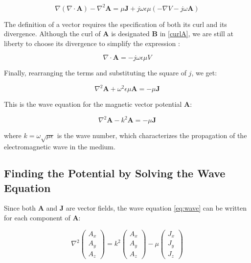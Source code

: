\[
    \nabla (\nabla \cdot \mathbf{A}) - \nabla^2 
    \mathbf{A} = \mu \mathbf{J} + j\omega \epsilon 
    \mu \left(-\nabla V - j \omega \mathbf{A}\right)
\]

The definition of a vector requires the specification 
of both its curl and its divergence. Although the curl 
of $\mathbf{A}$ is designated $\mathbf{B}$ in 
\ref{curlA}, we are still at liberty to choose its 
divergence to simplify the expression 
\cite{book-magnetism}:

\[
    \nabla \cdot \mathbf{A} = - j \omega \epsilon 
    \mu V
\]

Finally, rearranging the terms and substituting 
the square of $j$, we get:

\[
    \nabla^2 \mathbf{A} + \omega^2 \epsilon \mu 
    \mathbf{A} = -\mu \mathbf{J}
\]

This is the wave equation for the magnetic vector 
potential \(\mathbf{A}\):

\begin{equation}
    \nabla^2 \mathbf{A} - k^2 \mathbf{A} = 
    -\mu \mathbf{J}
    \label{eq:wave}
\end{equation}

where \(k = \omega \sqrt{\mu \epsilon}\) is the wave 
number, which characterizes the propagation of the 
electromagnetic wave in the medium.
\subsection{Finding the Potential by Solving the Wave Equation}

Since both \(\mathbf{A}\) and \(\mathbf{J}\) are vector 
fields, the wave equation \ref{eq:wave} can be written 
for each component of \(\mathbf{A}\):

\begin{equation}
    \nabla^2 
    \begin{pmatrix} 
        A_x \\ A_y \\ A_z 
    \end{pmatrix} = 
    k^2 
    \begin{pmatrix} 
        A_x \\ A_y \\ A_z 
    \end{pmatrix} - 
    \mu 
    \begin{pmatrix} 
        J_x \\ J_y \\ J_z 
    \end{pmatrix}
    \label{eq:wavematrix}
\end{equation}

